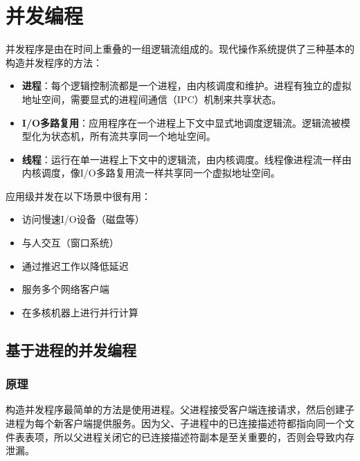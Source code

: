 \section{并发编程}

并发程序是由在时间上重叠的一组逻辑流组成的。现代操作系统提供了三种基本的构造并发程序的方法：
\begin{itemize}
    \item \textbf{进程}：每个逻辑控制流都是一个进程，由内核调度和维护。进程有独立的虚拟地址空间，需要显式的进程间通信（IPC）机制来共享状态。
    \item \textbf{I/O多路复用}：应用程序在一个进程上下文中显式地调度逻辑流。逻辑流被模型化为状态机，所有流共享同一个地址空间。
    \item \textbf{线程}：运行在单一进程上下文中的逻辑流，由内核调度。线程像进程流一样由内核调度，像I/O多路复用流一样共享同一个虚拟地址空间。
\end{itemize}

应用级并发在以下场景中很有用：
\begin{itemize}
    \item 访问慢速I/O设备（磁盘等）
    \item 与人交互（窗口系统）
    \item 通过推迟工作以降低延迟
    \item 服务多个网络客户端
    \item 在多核机器上进行并行计算
\end{itemize}

\subsection{基于进程的并发编程}

\subsubsection{原理}
构造并发程序最简单的方法是使用进程。父进程接受客户端连接请求，然后创建子进程为每个新客户端提供服务。因为父、子进程中的已连接描述符都指向同一个文件表表项，所以父进程关闭它的已连接描述符副本是至关重要的，否则会导致内存泄漏。

